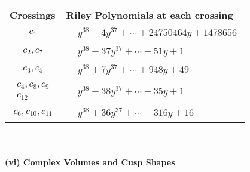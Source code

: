 \documentclass[1p]{elsarticle_modified}
\theoremstyle{definition}
\begin{document}
\begin{tabular}{m{50pt}|m{274pt}}
Crossings & \hspace{64pt}Riley Polynomials at each crossing \\
\hline $$\begin{aligned}c_{1}\end{aligned}$$&$\begin{aligned}
&y^{38}-4 y^{37}+\cdots+24750464 y+1478656
\end{aligned}$\\
\hline $$\begin{aligned}c_{2},c_{7}\end{aligned}$$&$\begin{aligned}
&y^{38}-37 y^{37}+\cdots-51 y+1
\end{aligned}$\\
\hline $$\begin{aligned}c_{3},c_{5}\end{aligned}$$&$\begin{aligned}
&y^{38}+7 y^{37}+\cdots+948 y+49
\end{aligned}$\\
\hline $$\begin{aligned}c_{4},c_{8},c_{9}\\c_{12}\end{aligned}$$&$\begin{aligned}
&y^{38}-38 y^{37}+\cdots-35 y+1
\end{aligned}$\\
\hline $$\begin{aligned}c_{6},c_{10},c_{11}\end{aligned}$$&$\begin{aligned}
&y^{38}+36 y^{37}+\cdots-316 y+16
\end{aligned}$\\
\hline
\end{tabular}\\~\\
\newpage\flushleft \textbf{(vi) Complex Volumes and Cusp Shapes}
\end{document}

